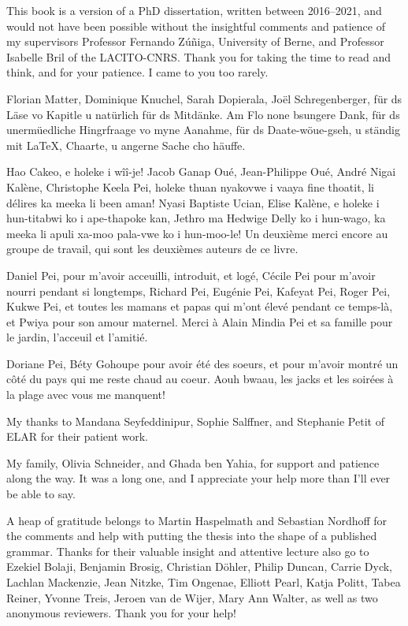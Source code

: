 \addchap{\lsAcknowledgementTitle} 


This book is a version of a PhD dissertation, written between 2016–2021, and would not have been possible without the insightful comments and patience of my supervisors Professor Fernando Zúñiga, University of Berne, and Professor Isabelle Bril of the LACITO-CNRS. Thank you for taking the time to read and think, and for your patience. I came to you too rarely.

Florian Matter, Dominique Knuchel, Sarah Dopierala, Joël Schregenberger, für ds Läse vo Kapitle u natürlich für ds Mitdänke. Am Flo none bsungere Dank, für ds unermüedliche Hingrfraage vo myne Aanahme, für ds Daate-wöue-gseh, u ständig mit \LaTeX{}, Chaarte, u angerne Sache cho häuffe.  

Hao Cakeo, e holeke i wîî-je! Jacob Ganap Oué, Jean-Philippe Oué, André Nigai Kalène, Christophe Keela Pei, holeke thuan nyakovwe i vaaya fine thoatit, li délires ka meeka li been aman! Nyasi Baptiste Ucian, Elise Kalène, e holeke i hun-titabwi ko i ape-thapoke kan, Jethro ma Hedwige Delly ko i hun-wago, ka meeka li apuli xa-moo pala-vwe ko i hun-moo-le! Un deuxième merci encore au groupe de travail, qui sont les deuxièmes auteurs de ce livre.

Daniel Pei, pour m'avoir acceuilli, introduit, et logé, Cécile Pei pour m'avoir nourri pendant si longtemps, Richard Pei, Eugénie Pei, Kafeyat Pei, Roger Pei, Kukwe Pei, et toutes les mamans et papas qui m'ont élevé pendant ce temps-là, et Pwiya pour son amour maternel. Merci à Alain Mindia Pei et sa famille pour le jardin, l'acceuil et l'amitié.

Doriane Pei, Béty Gohoupe pour avoir été des soeurs, et pour m'avoir montré un côté du pays qui me reste chaud au coeur. Aouh bwaau, les jacks et les soirées à la plage avec vous me manquent!

My thanks to Mandana Seyfeddinipur, Sophie Salffner, and Stephanie Petit of ELAR for their patient work.

My family, Olivia Schneider, and Ghada ben Yahia, for support and patience along the way. It was a long one, and I appreciate your help more than I'll ever be able to say.

A heap of gratitude belongs to Martin Haspelmath and Sebastian Nordhoff for the comments and help with putting the thesis into the shape of a published grammar. Thanks for their valuable insight and attentive lecture also go to Ezekiel Bolaji, Benjamin Brosig, Christian	Döhler, Philip	Duncan, Carrie Dyck, Lachlan Mackenzie, Jean Nitzke, Tim Ongenae, Elliott Pearl, Katja Politt, Tabea	Reiner, Yvonne Treis, Jeroen van de Wijer, Mary Ann	Walter, as well as two anonymous reviewers. Thank you for your help!
